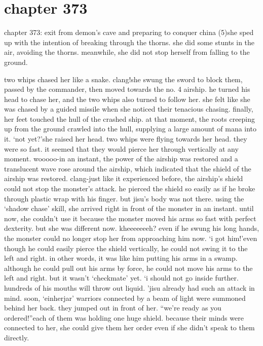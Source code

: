 \section{chapter 373}

chapter 373: exit from demon’s cave and preparing to conquer china (5)she sped up with the intention of breaking through the thorns.
 she did some stunts in the air, avoiding the thorns.
 meanwhile, she did not stop herself from falling to the ground.





two whips chased her like a snake.
clang!she swung the sword to block them, passed by the commander, then moved towards the no.
 4 airship.
 he turned his head to chase her, and the two whips also turned to follow her.
she felt like she was chased by a guided missile when she noticed their tenacious chasing.
finally, her feet touched the hull of the crashed ship.
 at that moment, the roots creeping up from the ground crawled into the hull, supplying a large amount of mana into it.
‘not yet?’she raised her head.
 two whips were flying towards her head.
 they were so fast.
it seemed that they would pierce her through vertically at any moment.
wooooo-in an instant, the power of the airship was restored and a translucent wave rose around the airship, which indicated that the shield of the airship was restored.
clang-just like it experienced before, the airship’s shield could not stop the monster’s attack.
 he pierced the shield so easily as if he broke through plastic wrap with his finger.
but jisu’s body was not there.
using the ‘shadow chase’ skill, she arrived right in front of the monster in an instant.
until now, she couldn’t use it because the monster moved his arms so fast with perfect dexterity.
 but she was different now.
kheeeeeeeh?
even if he swung his long hands, the monster could no longer stop her from approaching him now.
‘i got him!’even though he could easily pierce the shield vertically, he could not swing it to the left and right.
 in other words, it was like him putting his arms in a swamp.
 although he could pull out his arms by force, he could not move his arms to the left and right.
but it wasn’t ‘checkmate’ yet.
‘i should not go inside further.
 hundreds of his mouths will throw out liquid.
’jisu already had such an attack in mind.
 soon, ‘einherjar’ warriors connected by a beam of light were summoned behind her back.
 they jumped out in front of her.
“we’re ready as you ordered!”each of them was holding one huge shield.
 because their minds were connected to her, she could give them her order even if she didn’t speak to them directly.
